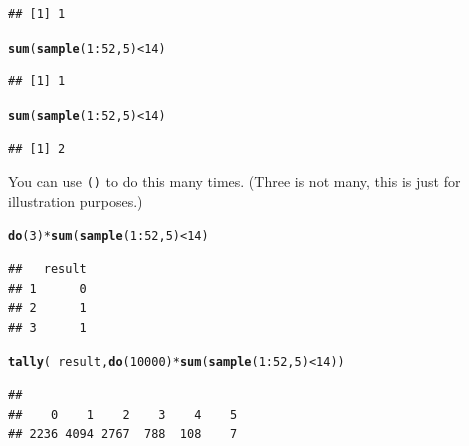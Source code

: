 \documentclass[twoside]{book}\usepackage[]{graphicx}\usepackage[]{xcolor}
\makeatletter
\newcommand{\hlnum}[1]{\textcolor[rgb]{0.686,0.059,0.569}{#1}}%
\newcommand{\hlopt}[1]{\textcolor[rgb]{0,0,0}{#1}}%
\newcommand{\hlstd}[1]{\textcolor[rgb]{0.345,0.345,0.345}{#1}}%
\newcommand{\hlkwd}[1]{\textcolor[rgb]{0.737,0.353,0.396}{\textbf{#1}}}%
\newenvironment{kframe}{%
 \def\at@end@of@kframe{}%
 \ifinner\ifhmode%
  \def\at@end@of@kframe{\end{minipage}}%
  \begin{minipage}{\columnwidth}%
 \fi\fi%
 \def\FrameCommand##1{\hskip\@totalleftmargin \hskip-\fboxsep
 \colorbox{shadecolor}{##1}\hskip-\fboxsep
     \hskip-\linewidth \hskip-\@totalleftmargin \hskip\columnwidth}%
 \MakeFramed {\advance\hsize-\width
   \@totalleftmargin\z@ \linewidth\hsize
   \@setminipage}}%
 {\par\unskip\endMakeFramed%
 \at@end@of@kframe}
\newenvironment{knitrout}{}{} %
\newcommand{\Rindex}[1]{\index{\texttt{#1}}}
\newcommand{\function}[1]{{\color{purple!75!blue}\texttt{\StrSubstitute{#1}{()}{}()}}\Rindex{#1}}
\makeatother
\begin{document}
\begin{problem}
\begin{knitrout}
\begin{kframe}
\begin{alltt}
\end{alltt}
\begin{verbatim}
## [1] 1
\end{verbatim}
\begin{alltt}
\hlkwd{sum}\hlstd{(}\hlkwd{sample}\hlstd{(}\hlnum{1}\hlopt{:}\hlnum{52}\hlstd{,} \hlnum{5}\hlstd{)} \hlopt{<} \hlnum{14}\hlstd{)}
\end{alltt}
\begin{verbatim}
## [1] 1
\end{verbatim}
\begin{alltt}
\hlkwd{sum}\hlstd{(}\hlkwd{sample}\hlstd{(}\hlnum{1}\hlopt{:}\hlnum{52}\hlstd{,} \hlnum{5}\hlstd{)} \hlopt{<} \hlnum{14}\hlstd{)}
\end{alltt}
\begin{verbatim}
## [1] 2
\end{verbatim}
\end{kframe}
\end{knitrout}
	You can use \function{do()} to do this many times. (Three is not many, this is just 
	for illustration purposes.)
\begin{knitrout}
\color{fgcolor}\begin{kframe}
\begin{alltt}
\hlkwd{do}\hlstd{(}\hlnum{3}\hlstd{)} \hlopt{*} \hlkwd{sum}\hlstd{(}\hlkwd{sample}\hlstd{(}\hlnum{1}\hlopt{:}\hlnum{52}\hlstd{,} \hlnum{5}\hlstd{)} \hlopt{<} \hlnum{14}\hlstd{)}
\end{alltt}
\begin{verbatim}
##   result
## 1      0
## 2      1
## 3      1
\end{verbatim}
\end{kframe}
\end{knitrout}
\end{problem}

\begin{solution}
\begin{knitrout}
\color{fgcolor}\begin{kframe}
\begin{alltt}
\hlkwd{tally}\hlstd{(}\hlopt{~}\hlstd{result,} \hlkwd{do}\hlstd{(}\hlnum{10000}\hlstd{)} \hlopt{*} \hlkwd{sum}\hlstd{(}\hlkwd{sample}\hlstd{(}\hlnum{1}\hlopt{:}\hlnum{52}\hlstd{,} \hlnum{5}\hlstd{)} \hlopt{<} \hlnum{14}\hlstd{))}
\end{alltt}
\begin{verbatim}
## 
##    0    1    2    3    4    5 
## 2236 4094 2767  788  108    7
\end{verbatim}
\end{kframe}
\end{knitrout}
\end{solution}
\end{document}
